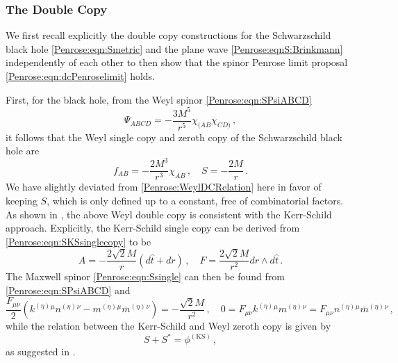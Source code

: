 \subsubsection{The Double Copy}\label{Penrose:sec:SdcPenrose}

We first recall explicitly the double copy constructions for the Schwarzschild black hole \eqref{Penrose:eqn:Smetric} and the plane wave \eqref{Penrose:eqnS:Brinkmann} independently of each other to then show that the spinor Penrose limit proposal \eqref{Penrose:eqn:dcPenroselimit} holds.

First, for the black hole, from the Weyl spinor \eqref{Penrose:eqn:SPsiABCD}
\begin{equation}\label{Penrose:eqn:Spsidc}
\Psi_{ABCD} = -\frac{3 M^5}{r^5} \chi_{(AB}\chi_{CD)} \, ,
\end{equation}
it follows that the Weyl single copy and zeroth copy of the Schwarzschild black hole are 
\begin{equation}\label{Penrose:eqn:Ssingle}
f_{AB} =   -\frac{2 M^3}{r^3} \chi_{AB} \, , \quad S = -\frac{2M}{r} \, . 
\end{equation}
We have slightly deviated from \eqref{Penrose:WeylDCRelation} here in favor of keeping $S$, which is only defined up to a constant, free of combinatorial factors. As shown in \cite{Luna:2018dpt}, the above Weyl double copy is consistent with the Kerr-Schild approach. Explicitly, the Kerr-Schild single copy can be derived from \eqref{Penrose:eqn:SKSsinglecopy} to be
\begin{equation}\label{Penrose:eqn:SKSsingle}
A =  -\frac{2 \sqrt{2} M}{r}\left(d\hat{t} +dr\right) \, , \quad F =   \frac{2 \sqrt{2} M}{r^2}    dr \wedge d\hat{t} \, .
\end{equation} 
The Maxwell spinor \eqref{Penrose:eqn:Ssingle} can then be found from \eqref{Penrose:eqn:SPsiABCD} and
\begin{equation}
\frac{F_{\mu \nu}}{2} \left(k^{(\eta)}{}^{\mu} n^{(\eta)}{}^{\nu} - m^{(\eta)}{}^{\mu}\bar{m}^{(\eta)}{}^{\nu}\right) =  -\frac{\sqrt{2} M}{r^2} \, , \quad	0 = F_{\mu \nu} k^{(\eta)}{}^{\mu} m^{(\eta)}{}^{\nu} =  F_{\mu \nu} n^{(\eta)}{}^{\mu} \bar{m}^{(\eta)}{}^{\nu} \, ,
\end{equation}
while the relation between the Kerr-Schild and Weyl zeroth copy is given by
\begin{equation}
S + S^* = \phi^{(\mathrm{KS})} \, ,
\end{equation}
as suggested in \cite{Luna:2018dpt}.

